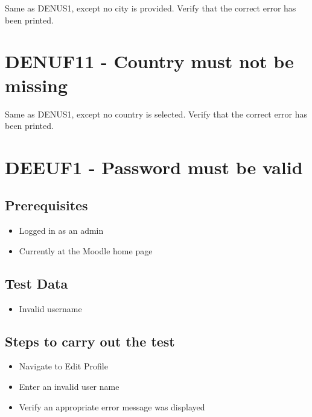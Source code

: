 \documentclass{article}
\begin{document}
Same as DENUS1, except no city is provided.
Verify that the correct error has been printed.

\section*{DENUF11 - Country must not be missing}

Same as DENUS1, except no country is selected.
Verify that the correct error has been printed.



\section*{DEEUF1 - Password must be valid}

\subsection*{Prerequisites}

\begin{itemize}
  \item Logged in as an admin
  \item Currently at the Moodle home page
\end{itemize}

\subsection*{Test Data}

\begin{itemize}
  \item Invalid username
\end{itemize}

\subsection*{Steps to carry out the test}

\begin{itemize}
  \item Navigate to Edit Profile
  \item Enter an invalid user name
  \item Verify an appropriate error message was displayed
\end{itemize}
\end{document}
